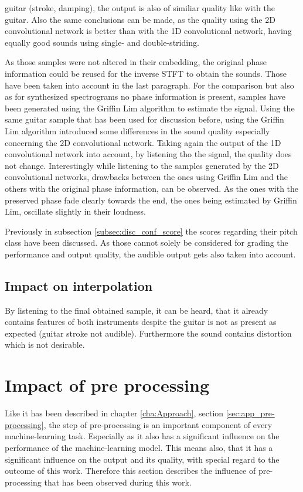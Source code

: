 guitar (stroke, damping), the output is also of similiar quality like with the guitar. Also the same conclusions can be made, as the quality using the 2D convolutional network is better than with the 1D convolutional network, having equally good sounds using single- and double-striding. 

As those samples were not altered in their embedding, the original phase information could be reused for the inverse STFT to obtain the sounds. Those have been taken into account in the last paragraph. For the comparison but also as for synthesized spectrograms no phase information is present, samples have been generated using the Griffin Lim algorithm \cite{Griffin1984} to estimate the signal. Using the same guitar sample that has been used for discussion before, using the Griffin Lim algorithm introduced some differences in the sound quality especially concerning the 2D convolutional network. Taking again the output of the 1D convolutional network into account, by listening tho the signal, the quality does not change. Interestingly while listening to the samples generated by the 2D convolutional networks, drawbacks between the ones using Griffin Lim and the others with the original phase information, can be observed. As the ones with the preserved phase fade clearly towards the end, the ones being estimated by Griffin Lim, oscillate slightly in their loudness.

Previously in subsection \ref{subsec:disc_conf_score} the scores regarding their pitch class have been discussed. As those cannot solely be considered for grading the performance and output quality, the audible output gets also taken into account. 


\subsection{Impact on interpolation}

By listening to the final obtained sample, it can be heard, that it already contains features of both instruments despite the guitar is not as present as expected (guitar stroke not audible). Furthermore the sound contains distortion which is not desirable.

\section{Impact of pre processing}
\label{sec:disc_imp_pre_processing}

Like it has been described in chapter \ref{cha:Approach}, section \ref{sec:app_pre-processing}, the step of pre-processing is an important component of every machine-learning task. Especially as it also has a significant influence on the performance of the machine-learning model. This means also, that it has a significant influence on the output and its quality, with special regard to the outcome of this work. Therefore this section describes the influence of pre-processing that has been observed during this work. 

